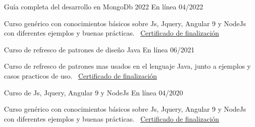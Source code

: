 \documentclass[]{awesome-cv}
\begin{document}
\begin{cventries}
	\cventry
	{}
	{Guía completa del desarrollo en MongoDb 2022 \vspace{-4mm}}
	{En línea \vspace{-5mm}}
	{04/2022 \vspace{-5mm}}
	{\begin{cvsectionnormaltext} 
		\item{Curso genérico con conocimientos básicos sobre Js, Jquery, Angular 9 y NodeJs con diferentes ejemplos y buenas prácticas.
		\newline \vspace{2mm} \faLink\ \href{https://www.udemy.com/certificate/UC-b990e98a-9b76-44b1-8e3e-43b68213725c/}{Certificado de finalización}}
	\end{cvsectionnormaltext}}
    {}
    
	\cventry
	{}
	{Curso de refresco de patrones de diseño Java \vspace{-4mm}}
	{En línea \vspace{-5mm}}
	{06/2021 \vspace{-5mm}}
	{\begin{cvsectionnormaltext} 
		\item{Curso de refresco de patrones mas usados en el lenguaje Java, junto a ejemplos y casos practicos de uso.
		\newline \vspace{2mm} \faLink\ \href{https://www.udemy.com/certificate/UC-982e3338-ea7d-4434-bf27-af8e38b77bd5/}{Certificado de finalización}}
	\end{cvsectionnormaltext}}
    {}

    
	\cventry
	{}
	{Curso de Js, Jquery, Angular 9 y NodeJs \vspace{-4mm}}
	{En línea \vspace{-5mm}}
	{04/2020 \vspace{-5mm}}
	{\begin{cvsectionnormaltext} 
		\item{Curso genérico con conocimientos básicos sobre Js, Jquery, Angular 9 y NodeJs con diferentes ejemplos y buenas prácticas.
		\newline \vspace{2mm} \faLink\ \href{https://www.udemy.com/certificate/UC-012febdf-7657-4e65-8708-ee4e18d5a8e1/}{Certificado de finalización}}
	\end{cvsectionnormaltext}}
    {}
\end{cventries}
\end{document}
